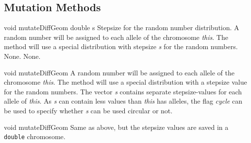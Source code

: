 \subsection{Mutation Methods}

\setNormalInstance
\printMethodWithOneParam
{void}
{mutateDiffGeom}
{double}
{s}
{Stepsize for the random number distribution.}
{A random number will be assigned to each allele of the chromosome 
 {\em this}. The method will use a special distribution with
 stepsize {\em s} for the random numbers.}
{None.}
{None.}

\clearpage

\setNormalInstance
\setCorrectWidthThree{8pt}
\printMethodWithParamsSaved
{void}
{}
{mutateDiffGeom}
{A random number will be assigned to each allele of the chromosome 
 {\em this}. The method will use a special distribution with
 a stepsize value for the random numbers. The vector {\em s}
 contains separate stepsize-values for each allele of {\em this}.
 As {\em s} can contain less values than {\em this} has alleles,
 the flag {\em cycle} can be used to specify whether {\em s}
 can be used circular or not.}
{}
\setCorrectWidthThree{4pt}

\vspace*{4ex}

\setNormalInstance
\setCorrectWidthThree{8pt}
\printMethodWithParamsSaved
{void}
{}
{mutateDiffGeom}
{Same as above, but the stepsize values are saved in a {\tt double}
 chromosome.}
{}
\setCorrectWidthThree{4pt}

